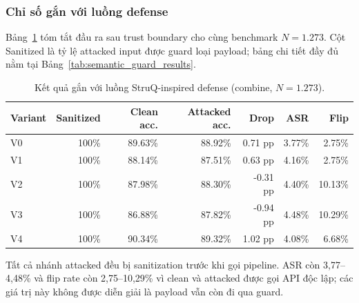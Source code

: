 \subsubsection{Chỉ số gắn với luồng defense}

Bảng~\ref{tab:attack_flow_defense_summary} tóm tắt đầu ra sau trust boundary
cho cùng benchmark $N=1.273$. Cột Sanitized là tỷ lệ attacked input được guard
loại payload; bảng chi tiết đầy đủ nằm tại Bảng~\ref{tab:semantic_guard_results}.

\begin{table}[H]
\centering
\small
\setlength{\tabcolsep}{4pt}
\caption{Kết quả gắn với luồng StruQ-inspired defense (combine, $N=1.273$).}
\label{tab:attack_flow_defense_summary}
\begin{tabular}{lrrrrrr}
\toprule
\textbf{Variant} & \textbf{Sanitized} & \textbf{Clean acc.} & \textbf{Attacked acc.} &
\textbf{Drop} & \textbf{ASR} & \textbf{Flip} \\
\midrule
V0 & 100\% & 89.63\% & 88.92\% & 0.71 pp  & 3.77\% & 2.75\% \\
V1 & 100\% & 88.14\% & 87.51\% & 0.63 pp  & 4.16\% & 2.75\% \\
V2 & 100\% & 87.98\% & 88.30\% & -0.31 pp & 4.40\% & 10.13\% \\
V3 & 100\% & 86.88\% & 87.82\% & -0.94 pp & 4.48\% & 10.29\% \\
V4 & 100\% & 90.34\% & 89.32\% & 1.02 pp  & 4.08\% & 6.68\% \\
\bottomrule
\end{tabular}
\end{table}

Tất cả nhánh attacked đều bị sanitization trước khi gọi pipeline. ASR còn
3,77--4,48\% và flip rate còn 2,75--10,29\% vì clean và attacked được gọi API
độc lập; các giá trị này không được diễn giải là payload vẫn còn đi qua guard.

